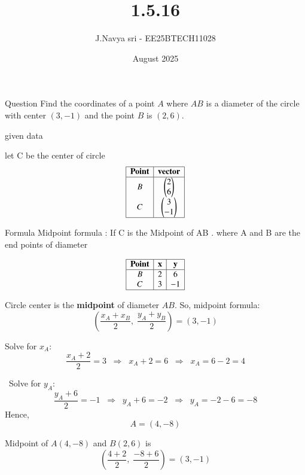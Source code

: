 \documentclass{beamer}
\title %
{1.5.16}
\date{August  2025}
\author %
{J.Navya sri - EE25BTECH11028}
\begin{document}
\frame{\titlepage}
\begin{frame}{Question}
Find the coordinates of a point $A$ where $AB$ is a diameter of the circle with center  
$(3, -1)$ and the point $B$ is $(2, 6)$.


\end{frame}
    
\begin{frame}{given data}
 
let C be the center of circle
\[
\begin{array}{|c|c|c|c|}
\hline
\textbf{Point} & \textbf{vector} \\
\hline
B & $\myvec{2\\6}$  \\
C & $\myvec{3\\-1}$ \\
\hline
\end{array}
\]

   
\end{frame}

\begin{frame}{Formula}
  Midpoint formula : If C is the Midpoint of AB . where A and B are the end points of diameter

\end{frame}
 
\[
\begin{array}{|c|c|c|c|}
\hline
\textbf{Point} & \textbf{x} & \textbf{y}\\
\hline
B & 2 & 6 \\
C & 3 & -1 \\
\hline
\end{array}
\]

\begin{enumerate}
 Circle center is the \textbf{midpoint} of diameter $AB$.  
    So, midpoint formula:  
    \[
    \left( \frac{x_A + x_B}{2}, \; \frac{y_A + y_B}{2} \right) = (3, -1)
    \]

 Solve for $x_A$:  
    \[
    \frac{x_A + 2}{2} = 3 \;\;\Rightarrow\;\; x_A + 2 = 6 \;\;\Rightarrow\;\; x_A = 6 - 2 = 4
    \]

    \ Solve for $y_A$:  
    \[
    \frac{y_A + 6}{2} = -1 \;\;\Rightarrow\;\; y_A + 6 = -2 \;\;\Rightarrow\;\; y_A = -2 - 6 = -8
    \]
Hence,  
    \[
    A = (4, -8)
    \]
\end{enumerate}

Midpoint of $A(4, -8)$ and $B(2, 6)$ is  
\[
\left( \frac{4+2}{2}, \; \frac{-8+6}{2} \right) = (3, -1)

\]
\end{document}

